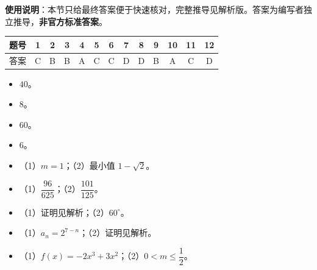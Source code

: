 
\begin{gknotice}
\textbf{使用说明}：本节只给最终答案便于快速核对，完整推导见解析版。答案为编写者独立推导，\textbf{非官方标准答案}。
\end{gknotice}

\begin{center}\begin{tabular}{ccccccccccccc}
\toprule
题号 & 1 & 2 & 3 & 4 & 5 & 6 & 7 & 8 & 9 & 10 & 11 & 12 \\
\midrule
答案 & C & B & B & A & C & C & D & D & B & A & C & D \\
\bottomrule
\end{tabular}\end{center}

\begin{itemize}[leftmargin=2.6em]
  \item[\textbf{13.}] $40$。
  \item[\textbf{14.}] $8$。
  \item[\textbf{15.}] $60$。
  \item[\textbf{16.}] $6$。
\end{itemize}

\begin{itemize}[leftmargin=2.6em]
  \item[\textbf{17.}] （1）$m=1$；（2）最小值 $1-\sqrt2$。
  \item[\textbf{18.}] （1）$\dfrac{96}{625}$；（2）$\dfrac{101}{125}$。
  \item[\textbf{19.}] （1）证明见解析；（2）$60^\circ$。
  \item[\textbf{20.}] （1）$a_n=2^{7-n}$；（2）证明见解析。
  \item[\textbf{21.}] （1）$f(x)=-2x^3+3x^2$；（2）$0<m\leqslant\dfrac12$。
\end{itemize}
